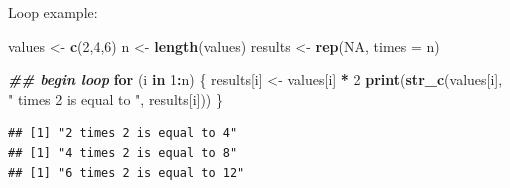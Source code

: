 \documentclass[
  ignorenonframetext,
]{beamer}
\newenvironment{Shaded}{\begin{snugshade}}{\end{snugshade}}
\newcommand{\AttributeTok}[1]{\textcolor[rgb]{0.13,0.29,0.53}{#1}}
\newcommand{\ConstantTok}[1]{\textcolor[rgb]{0.56,0.35,0.01}{#1}}
\newcommand{\ControlFlowTok}[1]{\textcolor[rgb]{0.13,0.29,0.53}{\textbf{#1}}}
\newcommand{\DecValTok}[1]{\textcolor[rgb]{0.00,0.00,0.81}{#1}}
\newcommand{\DocumentationTok}[1]{\textcolor[rgb]{0.56,0.35,0.01}{\textbf{\textit{#1}}}}
\newcommand{\FunctionTok}[1]{\textcolor[rgb]{0.13,0.29,0.53}{\textbf{#1}}}
\newcommand{\NormalTok}[1]{#1}
\newcommand{\OtherTok}[1]{\textcolor[rgb]{0.56,0.35,0.01}{#1}}
\newcommand{\SpecialCharTok}[1]{\textcolor[rgb]{0.81,0.36,0.00}{\textbf{#1}}}
\newcommand{\StringTok}[1]{\textcolor[rgb]{0.31,0.60,0.02}{#1}}
\begin{document}
\begin{frame}[fragile]{Loop example:}
\label{loop-example}
\small

\begin{Shaded}
\begin{Highlighting}[]
\NormalTok{values }\OtherTok{\textless{}{-}} \FunctionTok{c}\NormalTok{(}\DecValTok{2}\NormalTok{,}\DecValTok{4}\NormalTok{,}\DecValTok{6}\NormalTok{)}
\NormalTok{n }\OtherTok{\textless{}{-}} \FunctionTok{length}\NormalTok{(values)}
\NormalTok{results }\OtherTok{\textless{}{-}} \FunctionTok{rep}\NormalTok{(}\ConstantTok{NA}\NormalTok{, }\AttributeTok{times =}\NormalTok{ n)}

\DocumentationTok{\#\# begin loop}
\ControlFlowTok{for}\NormalTok{ (i }\ControlFlowTok{in} \DecValTok{1}\SpecialCharTok{:}\NormalTok{n) \{}
\NormalTok{  results[i] }\OtherTok{\textless{}{-}}\NormalTok{ values[i] }\SpecialCharTok{*} \DecValTok{2}
  \FunctionTok{print}\NormalTok{(}\FunctionTok{str\_c}\NormalTok{(values[i], }\StringTok{" times 2 is equal to "}\NormalTok{, results[i]))}
\NormalTok{\}}
\end{Highlighting}
\end{Shaded}

\begin{verbatim}
## [1] "2 times 2 is equal to 4"
## [1] "4 times 2 is equal to 8"
## [1] "6 times 2 is equal to 12"
\end{verbatim}
\end{frame}
\end{document}
